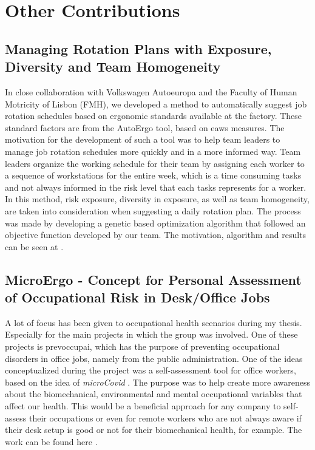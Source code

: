 \section{Other Contributions}

\subsection{Managing Rotation Plans with Exposure, Diversity and Team Homogeneity}

In close collaboration with Volkswagen Autoeuropa and the Faculty of Human Motricity of Lisbon (FMH), we developed a method to automatically suggest job rotation schedules based on ergonomic standards available at the factory. These standard factors are from the AutoErgo tool, based on \gls{eaws} measures. The motivation for the development of such a tool was to help team leaders to manage job rotation schedules more quickly and in a more informed way. Team leaders organize the working schedule for their team by assigning each worker to a sequence of workstations for the entire week, which is a time consuming tasks and not always informed in the risk level that each tasks represents for a worker. In this method, risk exposure, diversity in exposure, as well as team homogeneity, are taken into consideration when suggesting a daily rotation plan. The process was made by developing a genetic based optimization algorithm that followed an objective function developed by our team. The motivation, algorithm and results can be seen at \cite{jobrotation1}.

\subsection{MicroErgo - Concept for Personal Assessment of Occupational Risk in Desk/Office Jobs}

A lot of focus has been given to occupational health scenarios during my thesis. Especially for the main projects in which the group was involved. One of these projects is \gls{prevoccupai}, which has the purpose of preventing occupational disorders in office jobs, namely from the public administration. One of the ideas conceptualized during the project was a self-assessment tool for office workers, based on the idea of \textit{microCovid} \cite{microcovid}. The purpose was to help create more awareness about the biomechanical, environmental and mental occupational variables that affect our health. This would be a beneficial approach for any company to self-assess their occupations or even for remote workers who are not always aware if their desk setup is good or not for their biomechanical health, for example. The work can be found here \cite{microergo}.

